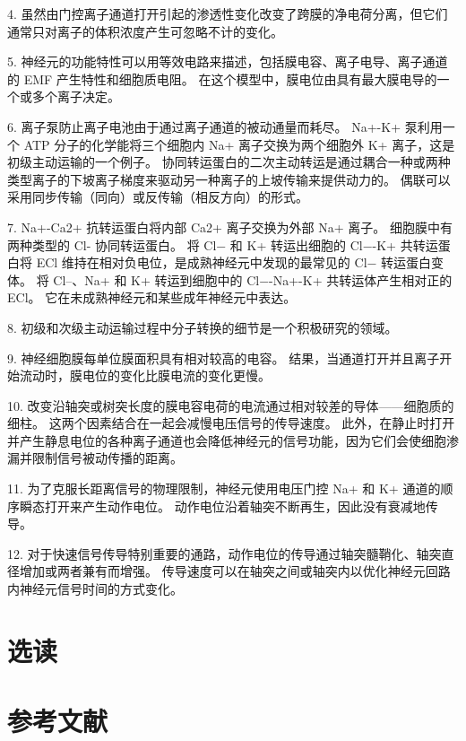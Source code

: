 4. 虽然由门控离子通道打开引起的渗透性变化改变了跨膜的净电荷分离，但它们通常只对离子的体积浓度产生可忽略不计的变化。 

5. 神经元的功能特性可以用等效电路来描述，包括膜电容、离子电导、离子通道的 EMF 产生特性和细胞质电阻。 在这个模型中，膜电位由具有最大膜电导的一个或多个离子决定。 

6. 离子泵防止离子电池由于通过离子通道的被动通量而耗尽。 Na+-K+ 泵利用一个 ATP 分子的化学能将三个细胞内 Na+ 离子交换为两个细胞外 K+ 离子，这是初级主动运输的一个例子。 协同转运蛋白的二次主动转运是通过耦合一种或两种类型离子的下坡离子梯度来驱动另一种离子的上坡传输来提供动力的。 偶联可以采用同步传输（同向）或反传输（相反方向）的形式。 

7. Na+-Ca2+ 抗转运蛋白将内部 Ca2+ 离子交换为外部 Na+ 离子。 细胞膜中有两种类型的 Cl- 协同转运蛋白。 将 Cl− 和 K+ 转运出细胞的 Cl−-K+ 共转运蛋白将 ECl 维持在相对负电位，是成熟神经元中发现的最常见的 Cl− 转运蛋白变体。 将 Cl–、Na+ 和 K+ 转运到细胞中的 Cl−-Na+-K+ 共转运体产生相对正的 ECl。 它在未成熟神经元和某些成年神经元中表达。 

8. 初级和次级主动运输过程中分子转换的细节是一个积极研究的领域。 

9. 神经细胞膜每单位膜面积具有相对较高的电容。 结果，当通道打开并且离子开始流动时，膜电位的变化比膜电流的变化更慢。 

10. 改变沿轴突或树突长度的膜电容电荷的电流通过相对较差的导体——细胞质的细柱。 这两个因素结合在一起会减慢电压信号的传导速度。 此外，在静止时打开并产生静息电位的各种离子通道也会降低神经元的信号功能，因为它们会使细胞渗漏并限制信号被动传播的距离。 

11. 为了克服长距离信号的物理限制，神经元使用电压门控 Na+ 和 K+ 通道的顺序瞬态打开来产生动作电位。 动作电位沿着轴突不断再生，因此没有衰减地传导。 

12. 对于快速信号传导特别重要的通路，动作电位的传导通过轴突髓鞘化、轴突直径增加或两者兼有而增强。 传导速度可以在轴突之间或轴突内以优化神经元回路内神经元信号时间的方式变化。

\section{选读}

\section{参考文献}







